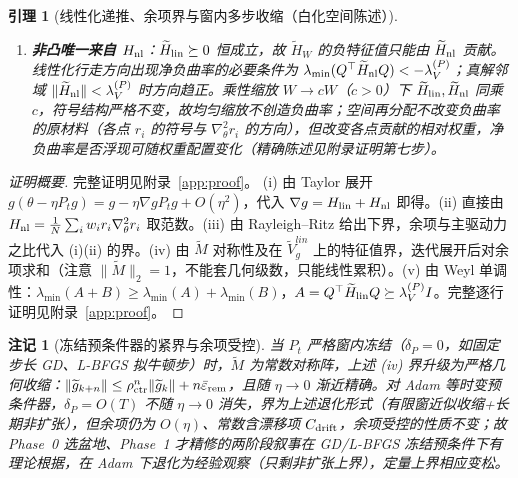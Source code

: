 \documentclass[fontset=windows,11pt]{ctexart}
\newcommand{\W}{W}
\newcommand{\wt}[1]{\widetilde{#1}}
\newtheorem{lemma}{引理}[section]
\newtheorem*{remark}{注记}
\numberwithin{equation}{section}
\begin{document}
\begin{lemma}[线性化递推、余项界与窗内多步收缩（白化空间陈述）]
\begin{enumerate}[label=(\roman*),leftmargin=2.4em,itemsep=3pt]
\begin{enumerate}[label=(\alph*),leftmargin=2em,itemsep=1pt]
  \end{enumerate}
  余项仍为 $O(\eta)$（常数含预条件器漂移项 $C_{\rm drift}$，其显式携带 $\|P_k^{1/2}\|$ 因子，见假设~(P)）；
\item \textbf{非凸唯一来自 $H_{\rm nl}$}：$\wt H_{\rm lin}\succeq0$ 恒成立，故 $\wt H_{\W}$ 的负特征值只能由 $\wt H_{\rm nl}$ 贡献。线性化行走方向出现净负曲率的必要条件为 $\lambda_{\min}(Q^\top\wt H_{\rm nl}Q)<-\lambda_V^{(P)}$；真解邻域 $\|\wt H_{\rm nl}\|<\lambda_V^{(P)}$ 时方向趋正。乘性缩放 $\W\to c\W$（$c>0$）下 $\wt H_{\rm lin},\wt H_{\rm nl}$ 同乘 $c$，符号结构严格不变，故均匀缩放不创造负曲率；空间再分配不改变负曲率的\emph{原材料}（各点 $r_i$ 的符号与 $\nabla_\theta^2r_i$ 的方向），但改变各点贡献的相对权重，净负曲率是否浮现可随权重配置变化（精确陈述见附录证明第七步）。
\end{enumerate}
\end{lemma}
\begin{proof}[证明概要]完整证明见附录~\ref{app:proof}。
(i) 由 Taylor 展开 $g(\theta-\eta P_tg)=g-\eta\nabla g P_tg+O(\eta^2)$，代入 $\nabla g=H_{\rm lin}+H_{\rm nl}$ 即得。(ii) 直接由 $H_{\rm nl}=\tfrac1N\sum_iw_ir_i\nabla_\theta^2r_i$ 取范数。(iii) 由 Rayleigh--Ritz 给出下界，余项与主驱动力之比代入 (i)(ii) 的界。(iv) 由 $\wt M$ 对称性及在 $\wt V_g^{lin}$ 上的特征值界，迭代展开后对余项求和（注意 $\|\wt M\|_2=1$，不能套几何级数，只能线性累积）。(v) 由 Weyl 单调性：$\lambda_{\min}(A+B)\ge\lambda_{\min}(A)+\lambda_{\min}(B)$，$A=Q^\top\wt H_{\rm lin}Q\succeq\lambda_V^{(P)}I$。完整逐行证明见附录~\ref{app:proof}。
\end{proof}

\begin{remark}[冻结预条件器的紧界与余项受控]\label{rem:linrec-frozen}
当 $P_t$ 严格窗内冻结（$\delta_P=0$，如固定步长 GD、L-BFGS 拟牛顿步）时，$\wt M$ 为常数对称阵，上述 (iv) 界升级为\emph{严格几何收缩}：$\|\wt g_{k+n}\|\le\rho_{\rm ctr}^n\|\wt g_k\|+n\bar\varepsilon_{\rm rem}$，且随 $\eta\to0$ 渐近精确。对 Adam 等时变预条件器，$\delta_P=O(T)$ 不随 $\eta\to0$ 消失，界为上述退化形式（有限窗近似收缩+长期非扩张），但余项仍为 $O(\eta)$、常数含漂移项 $C_{\rm drift}$，\emph{余项受控的性质不变}；故 Phase~0 选盆地、Phase~1 才精修的两阶段叙事在 GD/L-BFGS 冻结预条件下有理论根据，在 Adam 下退化为经验观察（只剩非扩张上界），定量上界相应变松。
\end{remark}
\end{document}
